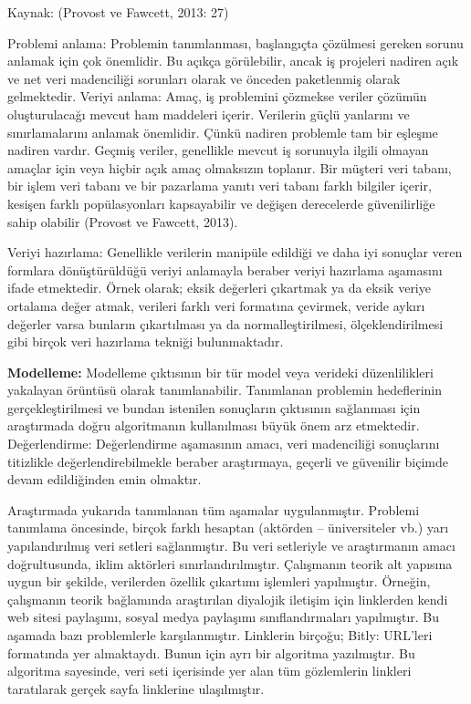 \documentclass[
]{book}
\begin{document}
Kaynak: (Provost ve Fawcett, 2013: 27)

Problemi anlama: Problemin tanımlanması, başlangıçta çözülmesi gereken sorunu anlamak için çok önemlidir. Bu açıkça görülebilir, ancak iş projeleri nadiren açık ve net veri madenciliği sorunları olarak ve önceden paketlenmiş olarak gelmektedir.
Veriyi anlama: Amaç, iş problemini çözmekse veriler çözümün oluşturulacağı mevcut ham maddeleri içerir. Verilerin güçlü yanlarını ve sınırlamalarını anlamak önemlidir. Çünkü nadiren problemle tam bir eşleşme nadiren vardır. Geçmiş veriler, genellikle mevcut iş sorunuyla ilgili olmayan amaçlar için veya hiçbir açık amaç olmaksızın toplanır. Bir müşteri veri tabanı, bir işlem veri tabanı ve bir pazarlama yanıtı veri tabanı farklı bilgiler içerir, kesişen farklı popülasyonları kapsayabilir ve değişen derecelerde güvenilirliğe sahip olabilir (Provost ve Fawcett, 2013).

Veriyi hazırlama: Genellikle verilerin manipüle edildiği ve daha iyi sonuçlar veren formlara dönüştürüldüğü veriyi anlamayla beraber veriyi hazırlama aşamasını ifade etmektedir. Örnek olarak; eksik değerleri çıkartmak ya da eksik veriye ortalama değer atmak, verileri farklı veri formatına çevirmek, veride aykırı değerler varsa bunların çıkartılması ya da normalleştirilmesi, ölçeklendirilmesi gibi birçok veri hazırlama tekniği bulunmaktadır.

\textbf{Modelleme:} Modelleme çıktısının bir tür model veya verideki düzenlilikleri yakalayan örüntüsü olarak tanımlanabilir. Tanımlanan problemin hedeflerinin gerçekleştirilmesi ve bundan istenilen sonuçların çıktısının sağlanması için araştırmada doğru algoritmanın kullanılması büyük önem arz etmektedir.
Değerlendirme: Değerlendirme aşamasının amacı, veri madenciliği sonuçlarını titizlikle değerlendirebilmekle beraber araştırmaya, geçerli ve güvenilir biçimde devam edildiğinden emin olmaktır.

Araştırmada yukarıda tanımlanan tüm aşamalar uygulanmıştır. Problemi tanımlama öncesinde, birçok farklı hesaptan (aktörden -- üniversiteler vb.) yarı yapılandırılmış veri setleri sağlanmıştır. Bu veri setleriyle ve araştırmanın amacı doğrultusunda, iklim aktörleri sınırlandırılmıştır. Çalışmanın teorik alt yapısına uygun bir şekilde, verilerden özellik çıkartımı işlemleri yapılmıştır. Örneğin, çalışmanın teorik bağlamında araştırılan diyalojik iletişim için linklerden kendi web sitesi paylaşımı, sosyal medya paylaşımı sınıflandırmaları yapılmıştır. Bu aşamada bazı problemlerle karşılanmıştır. Linklerin birçoğu; Bitly: URL'leri formatında yer almaktaydı. Bunun için ayrı bir algoritma yazılmıştır. Bu algoritma sayesinde, veri seti içerisinde yer alan tüm gözlemlerin linkleri taratılarak gerçek sayfa linklerine ulaşılmıştır.
\end{document}
